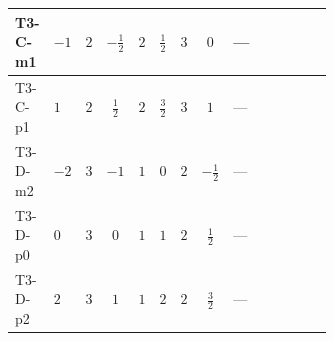 \documentclass[8pt]{article}
\begin{document}
\begin{landscape}
\begin{longtable}{@{}llcccccc >{\raggedright\arraybackslash}p{0.21\linewidth} >{\raggedright\arraybackslash}p{0.21\linewidth} >{\raggedright\arraybackslash}p{0.21\linewidth}@{}}
\midrule
T3-C-m1 & $-1$ & $2$ & $-\frac{1}{2}$ & $2$ & $\frac{1}{2}$ & $3$ & $0$ & --- & \scriptsize\adjustbox{max width=\linewidth}{$\begin{gathered} -\frac{4}{3} \operatorname{Tr}\!\left({y_1}\,\left({y_1}\right)^{\dagger}\,{Y_e}\,\left({Y_e}\right)^{\dagger}\right)\end{gathered}$} & \scriptsize\adjustbox{max width=\linewidth}{$\begin{gathered} +\frac{16}{3} {\lambda_5} \left({\lambda_5}\right)^{*}\end{gathered}$} \\
\midrule
T3-C-p1 & $1$ & $2$ & $\frac{1}{2}$ & $2$ & $\frac{3}{2}$ & $3$ & $1$ & --- & \scriptsize\adjustbox{max width=\linewidth}{$\begin{gathered} -\frac{4}{3} \operatorname{Tr}\!\left({y_1}\,\left({y_1}\right)^{\dagger}\,{Y_e}\,\left({Y_e}\right)^{\dagger}\right)\end{gathered}$} & \scriptsize\adjustbox{max width=\linewidth}{$\begin{gathered} +\frac{16}{3} {\lambda_5} \left({\lambda_5}\right)^{*}\end{gathered}$} \\
\midrule
T3-D-m2 & $-2$ & $3$ & $-1$ & $1$ & $0$ & $2$ & $-\frac{1}{2}$ & --- & \scriptsize\adjustbox{max width=\linewidth}{$\begin{gathered} -\frac{4}{3} \operatorname{Tr}\!\left({y_1}\,\left({y_1}\right)^{\dagger}\,{Y_e}\,\left({Y_e}\right)^{\dagger}\right)\end{gathered}$} & \scriptsize\adjustbox{max width=\linewidth}{$\begin{gathered} -\frac{8}{3} {\lambda_5} \left({\lambda_5}\right)^{*}\end{gathered}$} \\
\midrule
T3-D-p0 & $0$ & $3$ & $0$ & $1$ & $1$ & $2$ & $\frac{1}{2}$ & --- & \scriptsize\adjustbox{max width=\linewidth}{$\begin{gathered} -\frac{4}{3} \operatorname{Tr}\!\left({y_1}\,\left({y_1}\right)^{\dagger}\,{Y_e}\,\left({Y_e}\right)^{\dagger}\right)\end{gathered}$} & \scriptsize\adjustbox{max width=\linewidth}{$\begin{gathered} -\frac{8}{3} {\lambda_5} \left({\lambda_5}\right)^{*}\end{gathered}$} \\
\midrule
T3-D-p2 & $2$ & $3$ & $1$ & $1$ & $2$ & $2$ & $\frac{3}{2}$ & --- & \scriptsize\adjustbox{max width=\linewidth}{$\begin{gathered} -\frac{4}{3} \operatorname{Tr}\!\left({y_1}\,\left({y_1}\right)^{\dagger}\,{Y_e}\,\left({Y_e}\right)^{\dagger}\right)\end{gathered}$} & \scriptsize\adjustbox{max width=\linewidth}{$\begin{gathered} -\frac{8}{3} {\lambda_5} \left({\lambda_5}\right)^{*}\end{gathered}$} \\

\end{longtable}
\end{landscape}
\end{document}

